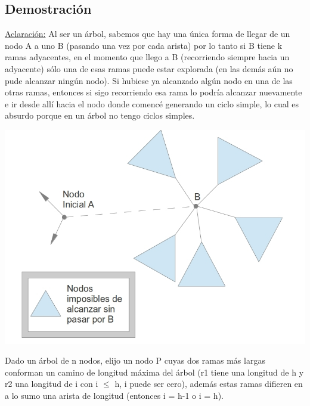 \subsection{Demostración}

\underline{Aclaración:} Al ser un árbol, sabemos que hay una única forma de llegar de un nodo A a uno B (pasando una vez por cada arista) por lo tanto si B tiene k ramas adyacentes, en el momento que llego a B (recorriendo siempre hacia un adyacente) sólo una de esas ramas puede estar explorada (en las demás aún no pude alcanzar ningún nodo). Si hubiese ya alcanzado algún nodo en una de las otras ramas, entonces si sigo recorriendo esa rama lo podría alcanzar nuevamente e ir desde allí hacia el nodo donde comencé generando un ciclo simple, lo cual es absurdo porque en un árbol no tengo ciclos simples.
\begin{center}
\includegraphics[scale=0.5]{ej2/2/graficos/imagen02.jpg} 
\end{center}
Dado un árbol de n nodos, elijo un nodo P cuyas dos ramas más largas conforman un camino de longitud máxima del árbol (r1 tiene una longitud de h y r2 una longitud de i con i $\leq$ h, i puede ser cero), además estas ramas difieren en a lo sumo una arista de longitud (entonces i = h-1 o i = h).


